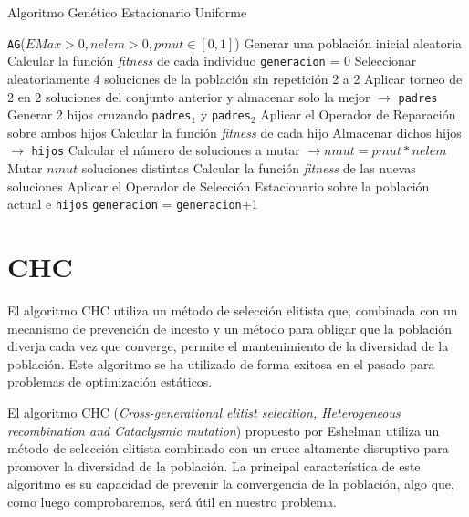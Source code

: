 \begin{algorithm}[H]
\caption{Algoritmo Genético Estacionario Uniforme}\label{alg:AGEU}
\begin{algorithmic}[1]
\Procedure \texttt{AG}($EMax > 0, nelem > 0, pmut \in [0,1]$)
\State Generar una población inicial aleatoria
\State Calcular la función \textit{fitness} de cada individuo
\State \texttt{generacion} = 0
	\State Seleccionar aleatoriamente 4 soluciones de la población sin repetición 2 a 2
	\State Aplicar torneo de 2 en 2 soluciones del conjunto anterior y almacenar solo la mejor $\xrightarrow{}{}$ \texttt{padres}
	\State Generar 2 hijos cruzando \texttt{padres$_1$} y \texttt{padres$_2$}
	\State Aplicar el Operador de Reparación sobre ambos hijos
	\State Calcular la función \textit{fitness} de cada hijo
	\State Almacenar dichos hijos $\xrightarrow{}{}$ \texttt{hijos}
	\State Calcular el número de soluciones a mutar $\xrightarrow{}{} nmut = pmut*nelem$
	\State Mutar $nmut$ soluciones distintas
	\State Calcular la función \textit{fitness} de las nuevas soluciones
	\State Aplicar el Operador de Selección Estacionario sobre la población actual e \texttt{hijos}
	\State \texttt{generacion} = \texttt{generacion}+1
\EndWhile
\EndProcedure
\end{algorithmic}
\end{algorithm}

\section{CHC}

El algoritmo CHC utiliza un método de selección elitista que, combinada con un mecanismo de prevención de incesto y un método para obligar que la población diverja cada vez que converge, permite el mantenimiento de la diversidad de la población. 
Este algoritmo se ha utilizado de forma exitosa en el pasado para problemas de optimización estáticos. 

El algoritmo CHC (\textit{Cross-generational elitist selecition, Heterogeneous recombination and Cataclysmic mutation}) propuesto por Eshelman utiliza un método de selección elitista  combinado con un cruce altamente disruptivo para promover la diversidad de la población. 
La principal característica de este algoritmo es su capacidad de prevenir la convergencia de la población, algo que, como luego comprobaremos, será útil en nuestro problema. 


